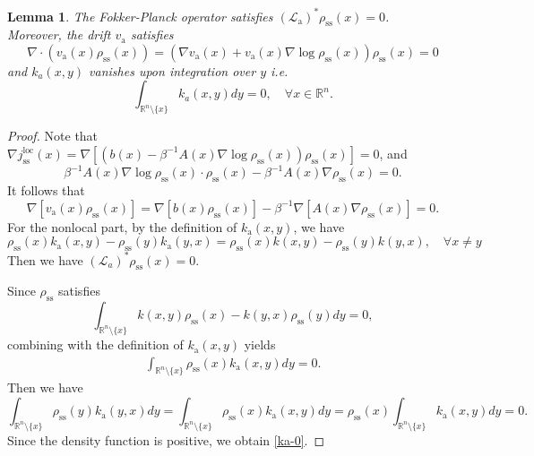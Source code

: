 \documentclass[10pt]{article}
\newtheorem{lemma}{Lemma}[section]
\theoremstyle{definition}
\numberwithin{equation}{section}
\begin{document}
\begin{lemma}
The Fokker-Planck operator satisfies $(\mathcal{L}_\mathrm{a})^*\rho_\mathrm{ss}(x)=0$.\\
Moreover, the drift $v_\mathrm{a}$ satisfies 
\begin{equation}\label{anti-va}
    \nabla\cdot (v_\mathrm{a}(x)\rho_\mathrm{ss}(x)) = (\nabla v_\mathrm{a}(x) + v_\mathrm{a}(x)\nabla\log \rho_\mathrm{ss}(x))\rho_\mathrm{ss}(x) = 0
\end{equation}
and $k_{a}(x,y)$ vanishes upon integration over $y$ i.e.
        \begin{equation}\label{ka-0}
            \int_{\mathbb{R}^n \setminus \{x\}} k_{a}(x,y)dy = 0,\quad \forall x \in \mathbb{R}^n.
        \end{equation}
\end{lemma}

\begin{proof}
Note that $\nabla j^\mathrm{loc}_\mathrm{ss}(x) = \nabla [(b(x) - \beta^{-1}A(x) \nabla \log \rho_\mathrm{ss}(x))\rho_\mathrm{ss}(x)] = 0$, and
\begin{equation*}
    \beta^{-1}A(x)\nabla\log\rho_\mathrm{ss}(x)\cdot\rho_\mathrm{ss}(x) - \beta^{-1}A(x)\nabla\rho_\mathrm{ss}(x) = 0.
\end{equation*}
It follows that
\begin{equation*}
    \nabla[v_\mathrm{a}(x)\rho_\mathrm{ss}(x)] = \nabla[b(x)\rho_\mathrm{ss}(x)] - \beta^{-1} \nabla[A(x)\nabla\rho_\mathrm{ss}(x)] = 0.
\end{equation*}
For the nonlocal part, by the definition of $k_\mathrm{a}(x,y)$, we have
\begin{equation*}
    \rho_\mathrm{ss}(x)k_\mathrm{a}(x,y) - \rho_\mathrm{ss}(y)k_\mathrm{a}(y,x) = \rho_\mathrm{ss}(x)k(x,y) - \rho_\mathrm{ss}(y)k(y,x), \quad \forall x\neq y
\end{equation*}
Then we have $(\mathcal{L}_{a})^*\rho_\mathrm{ss}(x) = 0$. 

Since $\rho_\mathrm{ss}$ satisfies
\begin{equation*}
    \int_{\mathbb{R}^n \setminus \{x\}} k(x,y)\rho_\mathrm{ss}(x) - k(y,x)\rho_\mathrm{ss}(y) dy = 0,
\end{equation*}
combining with the definition of $k_\mathrm{a}(x,y)$ yields
\begin{align}\label{anti-nonlocal}
  \int_{\mathbb{R}^n \setminus \{x\}}\rho_\mathrm{ss}(x) k_\mathrm{a}(x,y) dy = 0.
\end{align}
Then we have
\begin{equation}
    \int_{\mathbb{R}^n \setminus \{x\}}\rho_\mathrm{ss}(y) k_\mathrm{a}(y,x) dy = \int_{\mathbb{R}^n \setminus \{x\}} \rho_\mathrm{ss}(x)k_\mathrm{a}(x,y)dy = \rho_\mathrm{ss}(x)\int_{\mathbb{R}^n \setminus \{x\}} k_\mathrm{a}(x,y)dy = 0.
\end{equation}
Since the density function is positive, we obtain \eqref{ka-0}.
\end{proof}
\end{document}
